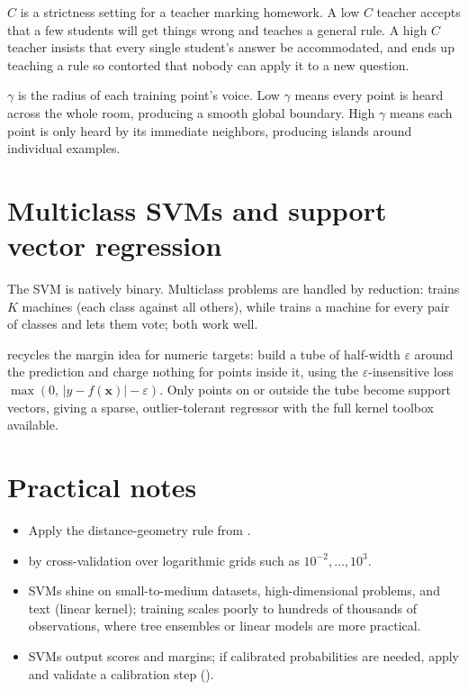 \begin{analogy}
$C$ is a strictness setting for a teacher marking homework. A low $C$ teacher accepts that a few students will get things wrong and teaches a general rule. A high $C$ teacher insists that every single student's answer be accommodated, and ends up teaching a rule so contorted that nobody can apply it to a new question.

$\gamma$ is the radius of each training point's voice. Low $\gamma$ means every point is heard across the whole room, producing a smooth global boundary. High $\gamma$ means each point is only heard by its immediate neighbors, producing islands around individual examples.
\end{analogy}

\section{Multiclass SVMs and support vector regression}

The SVM is natively binary. Multiclass problems are handled by reduction:  trains $K$ machines (each class against all others), while  trains a machine for every pair of classes and lets them vote; both work well.

 recycles the margin idea for numeric targets: build a tube of half-width $\varepsilon$ around the prediction and charge nothing for points inside it, using the $\varepsilon$-insensitive loss $\max(0,\,|y-f(\bm{x})|-\varepsilon)$. Only points on or outside the tube become support vectors, giving a sparse, outlier-tolerant regressor with the full kernel toolbox available.

\section{Practical notes}

\begin{itemize}
  \item {} Apply the distance-geometry rule from .
  \item {} by cross-validation over logarithmic grids such as $10^{-2},\ldots,10^{3}$.
  \item {} SVMs shine on small-to-medium datasets, high-dimensional problems, and text (linear kernel); training scales poorly to hundreds of thousands of observations, where tree ensembles or linear models are more practical.
  \item {} SVMs output scores and margins; if calibrated probabilities are needed, apply and validate a calibration step ().
\end{itemize}

